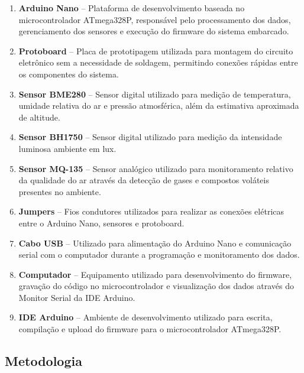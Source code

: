 \documentclass[a4paper,12pt]{article}
\begin{document}
\begin{enumerate}

    \item \textbf{Arduino Nano} -- Plataforma de desenvolvimento baseada no microcontrolador ATmega328P, responsável pelo processamento dos dados, gerenciamento dos sensores e execução do firmware do sistema embarcado.
    
    \item \textbf{Protoboard} -- Placa de prototipagem utilizada para montagem do circuito eletrônico sem a necessidade de soldagem, permitindo conexões rápidas entre os componentes do sistema.
    
    \item \textbf{Sensor BME280} -- Sensor digital utilizado para medição de temperatura, umidade relativa do ar e pressão atmosférica, além da estimativa aproximada de altitude.
    
    \item \textbf{Sensor BH1750} -- Sensor digital utilizado para medição da intensidade luminosa ambiente em lux.
    
    \item \textbf{Sensor MQ-135} -- Sensor analógico utilizado para monitoramento relativo da qualidade do ar através da detecção de gases e compostos voláteis presentes no ambiente.
    
    \item \textbf{Jumpers} -- Fios condutores utilizados para realizar as conexões elétricas entre o Arduino Nano, sensores e protoboard.
    
    \item \textbf{Cabo USB} -- Utilizado para alimentação do Arduino Nano e comunicação serial com o computador durante a programação e monitoramento dos dados.
    
    \item \textbf{Computador} -- Equipamento utilizado para desenvolvimento do firmware, gravação do código no microcontrolador e visualização dos dados através do Monitor Serial da IDE Arduino.
    
    \item \textbf{IDE Arduino} -- Ambiente de desenvolvimento utilizado para escrita, compilação e upload do firmware para o microcontrolador ATmega328P.
    
\end{enumerate}

\subsection{Metodologia}
\end{document}
